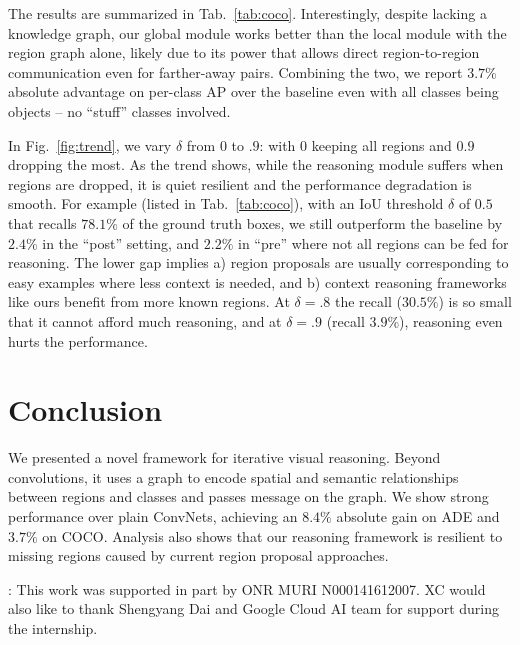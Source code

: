 \documentclass[10pt,twocolumn,letterpaper]{article}
\begin{document}
The results are summarized in Tab.~\ref{tab:coco}. Interestingly, despite lacking a knowledge graph, our global module works better than the local module with the region graph alone, likely due to its power that allows direct region-to-region communication even for farther-away pairs. Combining the two, we report $3.7\%$ absolute advantage on per-class AP over the baseline even with all classes being objects -- no ``stuff'' classes involved.

In Fig.~\ref{fig:trend}, we vary $\delta$ from $0$ to $.9$: with $0$ keeping all regions and $0.9$ dropping the most. As the trend shows, while the reasoning module suffers when regions are dropped, it is quiet resilient and the performance degradation is smooth. For example (listed in Tab.~\ref{tab:coco}), with an IoU threshold $\delta$ of $0.5$ that recalls $78.1\%$ of the ground truth boxes, we still outperform the baseline by $2.4\%$ in the ``post'' setting, and $2.2\%$ in ``pre'' where not all regions can be fed for reasoning. The lower gap implies a) region proposals are usually corresponding to easy examples where less context is needed, and b) context reasoning frameworks like ours benefit from more known regions. At $\delta{=}.8$ the recall ($30.5\%$) is so small that it cannot afford much reasoning, and at $\delta{=}.9$ (recall $3.9\%$), reasoning even hurts the performance.

\vspace{-0.05in}
\section{Conclusion}
\vspace{-0.05in}
We presented a novel framework for iterative visual reasoning. Beyond convolutions, it uses a graph to encode spatial and semantic relationships between regions and classes and passes message on the graph. We show strong performance over plain ConvNets, \eg achieving an $8.4\%$ absolute gain on ADE and $3.7\%$ on COCO. Analysis also shows that our reasoning framework is resilient to missing regions caused by current region proposal approaches. 

: This work was supported in part by ONR MURI N000141612007. XC would also like to thank Shengyang Dai and Google Cloud AI team for support during the internship. 
\end{document}
